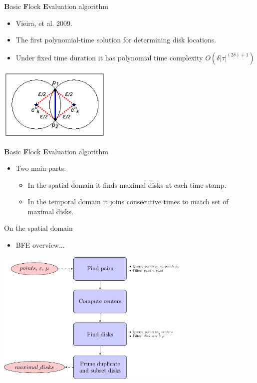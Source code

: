 \documentclass{beamer}
\begin{document}
    \begin{frame}{\textbf{B}asic \textbf{F}lock \textbf{E}valuation algorithm}
        \begin{itemize}
            \item Vieira, et al. 2009.
            \item The first polynomial-time solution for determining disk locations.
            \item Under fixed time duration it has polynomial time complexity $O(\delta|\tau|^{(2\delta) + 1})$
        \end{itemize}
        \vspace{0.25cm}

        \centering
        \includegraphics[width=0.4\textwidth]{figures/theorem}

    \end{frame}

    \begin{frame}{\textbf{B}asic \textbf{F}lock \textbf{E}valuation algorithm}
        \begin{itemize}
            \item Two main parts:
            \begin{itemize}
                \item In the spatial domain it finds maximal disks at each time stamp.
                \item In the temporal domain it joins consecutive times to match set of maximal disks.
            \end{itemize}
        \end{itemize}
    \end{frame}

    \begin{frame}{On the spatial domain}
        \begin{itemize} \item BFE overview... \end{itemize} \vspace{0.5cm}

        \centering
        \includegraphics[width=0.7\textwidth]{../thesis/chapter4/figures/MF_flowchart}
    \end{frame}
\end{document}
